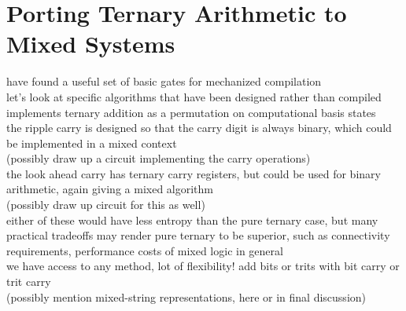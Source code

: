 \section{Porting Ternary Arithmetic to Mixed Systems}
have found a useful set of basic gates for mechanized compilation
\\let's look at specific algorithms that have been designed rather than compiled
\\\cite{arithmetics} implements ternary addition as a permutation on computational basis states
\\the ripple carry is designed so that the carry digit is always binary, which could be implemented in a mixed context
\\(possibly draw up a circuit implementing the carry operations)
\\the look ahead carry has ternary carry registers, but could be used for binary arithmetic, again giving a mixed algorithm
\\(possibly draw up circuit for this as well)
\\either of these would have less entropy than the pure ternary case, but many practical tradeoffs may render pure ternary to be superior, such as connectivity requirements, performance costs of mixed logic in general
\\we have access to any method, lot of flexibility! add bits or trits with bit carry or trit carry
\\(possibly mention mixed-string representations, here or in final discussion)
